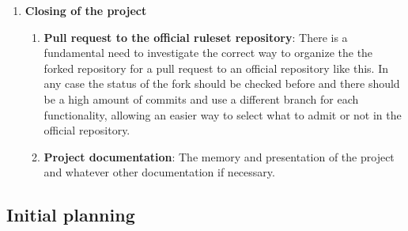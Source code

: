 \begin{enumerate}
	\item \textbf{Closing of the project}
	\begin{enumerate}[label=\alph*]
		\item \textbf{Pull request to the official ruleset repository}: There is a fundamental need to investigate the correct way to organize the the forked repository for a pull request to an official repository like this. In any case the status of the fork should be checked before and there should be a high amount of commits and use a different branch for each functionality, allowing an easier way to select what to admit or not in the official repository.
		\item \textbf{Project documentation}: The memory and presentation of the project and whatever other documentation if necessary.
	\end{enumerate}
\end{enumerate}







\subsection{Initial planning}










\newcommand{\Duno}{0}
\newcommand{\Ddos}{7}
\newcommand{\Dtres}{28}
\newcommand{\Dcuatro}{7}
\newcommand{\Dcinco}{21}
\newcommand{\Dseis}{7}
\newcommand{\Dsiete}{21}
\newcommand{\Docho}{14}
\newcommand{\Dnueve}{14}
\newcommand{\Ddiez}{14}

\newcommand{\Funo}{\the\numexpr \Duno /7 \relax}
\newcommand{\Fdos}{\the\numexpr \Funo + \Ddos/7 \relax}
\newcommand{\Ftres}{\the\numexpr \Fdos + \Dtres/7 \relax}
\newcommand{\Fcuatro}{\the\numexpr \Ftres + \Dcuatro/7 \relax}
\newcommand{\Fcinco}{\the\numexpr \Fcuatro + \Dcinco/7 \relax}
\newcommand{\Fseis}{\the\numexpr \Fcinco + \Dseis/7 \relax}
\newcommand{\Fsiete}{\the\numexpr \Fseis + \Dsiete/7 \relax}
\newcommand{\Focho}{\the\numexpr \Fsiete + \Docho/7 \relax}
\newcommand{\Fnueve}{\the\numexpr \Focho + \Dnueve/7 \relax}
\newcommand{\Fdiez}{\the\numexpr \Fnueve + \Ddiez/7 \relax}

